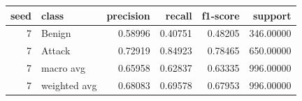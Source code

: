 \begin{tabular}{rlrrrr}
\toprule
seed & class & precision & recall & f1-score & support \\
\midrule
7 & Benign & 0.58996 & 0.40751 & 0.48205 & 346.00000 \\
7 & Attack & 0.72919 & 0.84923 & 0.78465 & 650.00000 \\
7 & macro avg & 0.65958 & 0.62837 & 0.63335 & 996.00000 \\
7 & weighted avg & 0.68083 & 0.69578 & 0.67953 & 996.00000 \\
\bottomrule
\end{tabular}
